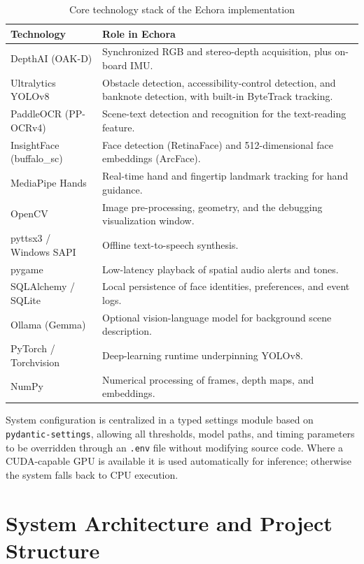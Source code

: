 \begin{table}[H]
\centering
\begin{tabular}{|p{}|p{}|}
\hline
\textbf{Technology} & \textbf{Role in Echora} \\
\hline
DepthAI (OAK-D) & Synchronized RGB and stereo-depth acquisition, plus on-board IMU. \\
\hline
Ultralytics YOLOv8 & Obstacle detection, accessibility-control detection, and banknote detection, with built-in ByteTrack tracking. \\
\hline
PaddleOCR (PP-OCRv4) & Scene-text detection and recognition for the text-reading feature. \\
\hline
InsightFace (buffalo\_sc) & Face detection (RetinaFace) and 512-dimensional face embeddings (ArcFace). \\
\hline
MediaPipe Hands & Real-time hand and fingertip landmark tracking for hand guidance. \\
\hline
OpenCV & Image pre-processing, geometry, and the debugging visualization window. \\
\hline
pyttsx3 / Windows SAPI & Offline text-to-speech synthesis. \\
\hline
pygame & Low-latency playback of spatial audio alerts and tones. \\
\hline
SQLAlchemy / SQLite & Local persistence of face identities, preferences, and event logs. \\
\hline
Ollama (Gemma) & Optional vision-language model for background scene description. \\
\hline
PyTorch / Torchvision & Deep-learning runtime underpinning YOLOv8. \\
\hline
NumPy & Numerical processing of frames, depth maps, and embeddings. \\
\hline
\end{tabular}
\caption{Core technology stack of the Echora implementation}
\label{tab:tech_stack}
\end{table}

System configuration is centralized in a typed settings module based on \texttt{pydantic-settings}, allowing all thresholds, model paths, and timing parameters to be overridden through an \texttt{.env} file without modifying source code. Where a CUDA-capable GPU is available it is used automatically for inference; otherwise the system falls back to CPU execution.

\section{System Architecture and Project Structure}

